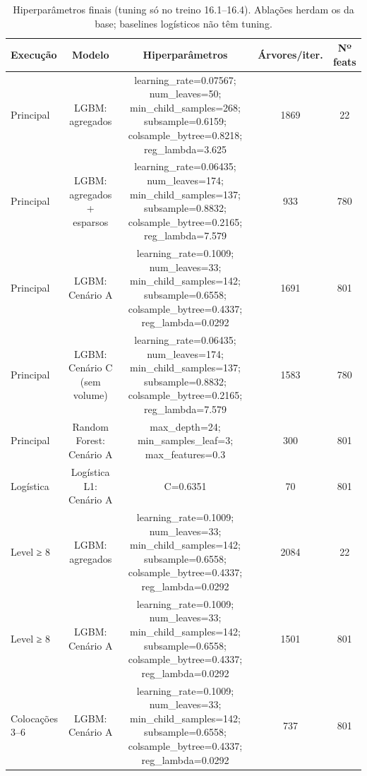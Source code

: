 \begin{table}[htbp]
\caption{Hiperparâmetros finais (tuning só no treino 16.1–16.4). Ablações herdam os da base; baselines logísticos não têm tuning.}
\label{tab:hparams}
\centering
\small
\begin{tabular}{lcccc}
\toprule
Execução & Modelo & Hiperparâmetros & Árvores/iter. & Nº feats \\
\midrule
Principal & LGBM: agregados & learning\_rate=0.07567; num\_leaves=50; min\_child\_samples=268; subsample=0.6159; colsample\_bytree=0.8218; reg\_lambda=3.625 & 1869 & 22 \\
Principal & LGBM: agregados + esparsos & learning\_rate=0.06435; num\_leaves=174; min\_child\_samples=137; subsample=0.8832; colsample\_bytree=0.2165; reg\_lambda=7.579 & 933 & 780 \\
Principal & LGBM: Cenário A & learning\_rate=0.1009; num\_leaves=33; min\_child\_samples=142; subsample=0.6558; colsample\_bytree=0.4337; reg\_lambda=0.0292 & 1691 & 801 \\
Principal & LGBM: Cenário C (sem volume) & learning\_rate=0.06435; num\_leaves=174; min\_child\_samples=137; subsample=0.8832; colsample\_bytree=0.2165; reg\_lambda=7.579 & 1583 & 780 \\
Principal & Random Forest: Cenário A & max\_depth=24; min\_samples\_leaf=3; max\_features=0.3 & 300 & 801 \\
Logística & Logística L1: Cenário A & C=0.6351 & 70 & 801 \\
Level ≥ 8 & LGBM: agregados & learning\_rate=0.1009; num\_leaves=33; min\_child\_samples=142; subsample=0.6558; colsample\_bytree=0.4337; reg\_lambda=0.0292 & 2084 & 22 \\
Level ≥ 8 & LGBM: Cenário A & learning\_rate=0.1009; num\_leaves=33; min\_child\_samples=142; subsample=0.6558; colsample\_bytree=0.4337; reg\_lambda=0.0292 & 1501 & 801 \\
Colocações 3–6 & LGBM: Cenário A & learning\_rate=0.1009; num\_leaves=33; min\_child\_samples=142; subsample=0.6558; colsample\_bytree=0.4337; reg\_lambda=0.0292 & 737 & 801 \\
\bottomrule
\end{tabular}
\end{table}
